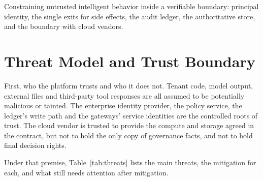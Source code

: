 {Constraining untrusted intelligent behavior inside a verifiable boundary: principal identity, the single exits for side effects, the audit ledger, the authoritative store, and the boundary with cloud vendors.}

\section{Threat Model and Trust Boundary}
\label{sec:threat}

First, who the platform trusts and who it does not. Tenant code, model output, external files and third-party tool responses are all assumed to be potentially malicious or tainted. The enterprise identity provider, the policy service, the ledger's write path and the gateways' service identities are the controlled roots of trust. The cloud vendor is trusted to provide the compute and storage agreed in the contract, but not to hold the only copy of governance facts, and not to hold final decision rights.

Under that premise, Table~\ref{tab:threats} lists the main threats, the mitigation for each, and what still needs attention after mitigation.

